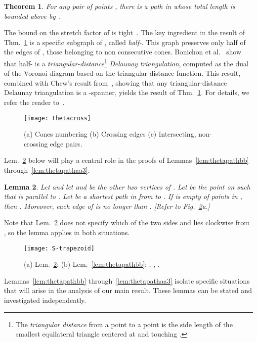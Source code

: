 \documentclass[11pt]{article}
\newtheorem{theorem}{{\bf Theorem}}
\newtheorem{lemma}[theorem]{Lemma}
\begin{document}
\begin{theorem}
For any pair of points , there is a path in 
whose total length is bounded above by .
~\emph{\cite{Bon+10}}
\label{thm:theta6}
\end{theorem}
The bound  on the stretch factor of  is tight~\cite{Bon+10}. The key ingredient in the result of Thm.~\ref{thm:theta6} is a specific subgraph of , called \emph{half-}. This graph preserves only half of the edges of , those belonging to non
consecutive cones. Bonichon et al.~\cite{Bon+10} show that half- is a
\emph{triangular-distance}\footnote{The \emph{triangular distance} from a point  to a point 
is the side length of the smallest equilateral triangle centered at  and touching .}
\emph{Delaunay triangulation}, computed as the dual of the Voronoi diagram based on
the triangular distance function.
This result, combined with Chew's result from~\cite{Chew89}, showing that any triangular-distance Delaunay triangulation is a -spanner, yields the result of Thm.~\ref{thm:theta6}. For details, we refer the reader
to~\cite{Bon+10}.


\begin{figure}[htpb]
\centering
\texttt{[image: thetacross]}
\caption{(a) Cones numbering (b) Crossing edges (c) Intersecting, non-crossing edge pairs.}
\label{fig:thetacross}
\end{figure}


\noindent
Lem.~\ref{lem:thetapath} below will play a central role in the proofs of Lemmas~\ref{lem:thetapathbb} through~\ref{lem:thetapathaa3}.
\begin{lemma}
Let  and let  and  be the other two vertices of . Let  be the point on  such that  is parallel to . Let  be a shortest path in  from  to . If  is empty of points in , then . Moreover, each edge of  is no longer than . \emph{[Refer to Fig.~\ref{fig:S-trapezoid}a.]}
\label{lem:thetapath}
\end{lemma}
Note that Lem.~\ref{lem:thetapath} does not specify which of the two sides  and  lies clockwise from , so the lemma applies in both situations.

\begin{figure}[htpb]
\centering
\texttt{[image: S-trapezoid]}
\caption{(a) Lem.~\ref{lem:thetapath}: 
(b) Lem.~\ref{lem:thetapathbb}: , , . }
\label{fig:S-trapezoid}
\end{figure}


\medskip
\noindent
Lemmas~\ref{lem:thetapathbb} through~\ref{lem:thetapathaa3} isolate specific situations that will arise in the analysis of our main result. These lemmas can be stated and investigated independently.
\end{document}
